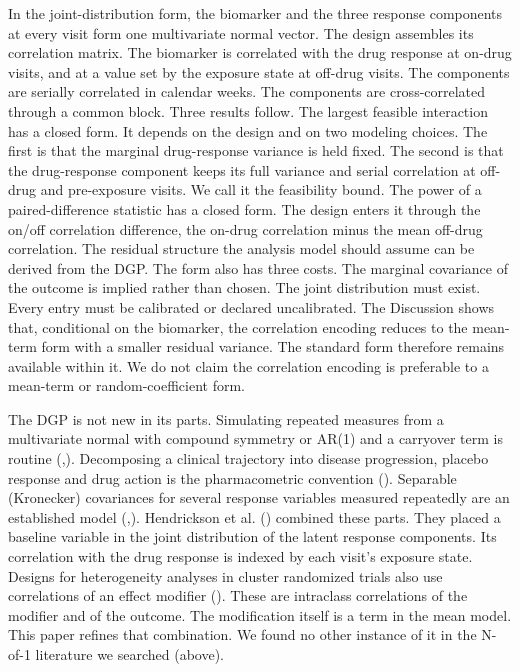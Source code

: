 \documentclass[
  11pt,
]{article}
\begin{document}
In the joint-distribution form, the biomarker and the three response
components at every visit form one multivariate normal vector. The
design assembles its correlation matrix. The biomarker is correlated
with the drug response at on-drug visits, and at a value set by the
exposure state at off-drug visits. The components are serially
correlated in calendar weeks. The components are cross-correlated
through a common block. Three results follow. The largest feasible
interaction has a closed form. It depends on the design and on two
modeling choices. The first is that the marginal drug-response
variance is held fixed. The second is that the drug-response
component keeps its full variance and serial correlation at off-drug
and pre-exposure visits. We call it the feasibility bound. The power of a
paired-difference statistic has a closed form. The design enters it
through the on/off correlation difference, the on-drug correlation
minus the mean off-drug correlation. The residual structure the
analysis model should assume can be derived from the DGP. The form
also has three costs. The marginal covariance of the outcome is
implied rather than chosen. The joint distribution must exist. Every
entry must be calibrated or declared uncalibrated. The Discussion
shows that, conditional on the biomarker, the correlation encoding
reduces to the mean-term form with a smaller residual variance. The
standard form therefore remains available within it. We do not claim
the correlation encoding is preferable to a mean-term
or random-coefficient form.

The DGP is not new in its parts. Simulating repeated measures from a
multivariate normal with compound symmetry or AR(1) and a carryover
term is routine (,). Decomposing a clinical
trajectory into disease progression, placebo response and drug action
is the pharmacometric convention (). Separable (Kronecker)
covariances for several response variables measured repeatedly are an
established model (,). Hendrickson et
al. () combined these parts. They placed a baseline
variable in the joint distribution of the latent response components.
Its correlation with the drug response is indexed by each visit's
exposure state. Designs for heterogeneity analyses in cluster
randomized trials also use correlations of an effect modifier
(). These are intraclass correlations of the modifier and of
the outcome. The modification itself is a term in the mean model.
This paper refines that combination. We found no other instance of it
in the N-of-1 literature we searched (above).
\end{document}
